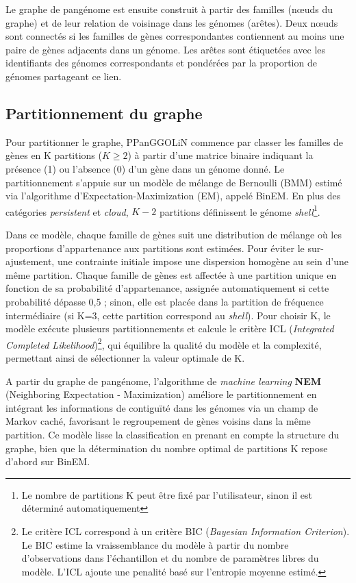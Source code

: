 Le graphe de pangénome est ensuite construit à partir des familles (n\oe uds du graphe) et de leur relation de voisinage dans les génomes (arêtes). Deux n\oe uds sont connectés si les familles de gènes correspondantes contiennent au moins une paire de gènes adjacents dans un génome. Les arêtes sont étiquetées avec les identifiants des génomes correspondants et pondérées par la proportion de génomes partageant ce lien.

\subsection{Partitionnement du graphe}

Pour partitionner le graphe, PPanGGOLiN commence par classer les familles de gènes en K partitions ($K\geq2$) à partir d’une matrice binaire indiquant la présence (1) ou l’absence (0) d’un gène dans un génome donné. Le partitionnement s’appuie sur un modèle de mélange de Bernoulli (BMM) estimé via l’algorithme d’Expectation-Maximization (EM), appelé BinEM. En plus des catégories \textit{persistent} et \textit{cloud}, $K-2$  partitions définissent le génome \textit{shell}\footnote{Le nombre de partitions K peut être fixé par l’utilisateur, sinon il est déterminé automatiquement}.

Dans ce modèle, chaque famille de gènes suit une distribution de mélange où les proportions d’appartenance aux partitions sont estimées. Pour éviter le sur-ajustement, une contrainte initiale impose une dispersion homogène au sein d’une même partition.
Chaque famille de gènes est affectée à une partition unique en fonction de sa probabilité d’appartenance, assignée automatiquement si cette probabilité dépasse 0,5 ; sinon, elle est placée dans la partition de fréquence intermédiaire (si K=3, cette partition correspond au \textit{shell}). Pour choisir K, le modèle exécute plusieurs partitionnements et calcule le critère ICL (\textit{Integrated Completed Likelihood})\footnote{ Le critère ICL correspond à un critère BIC (\textit{Bayesian Information Criterion}). Le BIC estime la vraissemblance du modèle à partir du nombre d'observations dans l'échantillon et du nombre de paramètres libres du modèle. L'ICL ajoute une penalité basé sur l'entropie moyenne estimé.}, qui équilibre la qualité du modèle et la complexité, permettant ainsi de sélectionner la valeur optimale de K.

A partir du graphe de pangénome, l’algorithme de \textit{machine learning} \textbf{NEM} (Neighboring Expectation - Maximization) \cite{soares_clustering_1997} améliore le partitionnement en intégrant les informations de contiguïté dans les génomes via un champ de Markov caché, favorisant le regroupement de gènes voisins dans la même partition. Ce modèle lisse la classification en prenant en compte la structure du graphe, bien que la détermination du nombre optimal de partitions K repose d’abord sur BinEM.

